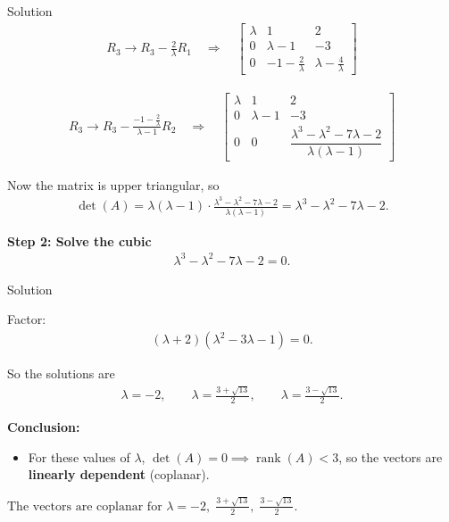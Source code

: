 \documentclass{beamer}
\numberwithin{equation}{section}
\theoremstyle{remark}
\begin{document}
\begin{frame}{Solution}
\begin{align}
R_3 \to R_3 - \tfrac{2}{\lambda}R_1 \quad \Rightarrow \quad
\begin{bmatrix}
\lambda & 1 & 2 \\
0 & \lambda-1 & -3 \\
0 & -1-\tfrac{2}{\lambda} & \lambda - \tfrac{4}{\lambda}
\end{bmatrix}
\end{align}

\begin{align}
R_3 \to R_3 - \frac{-1-\tfrac{2}{\lambda}}{\lambda-1}R_2
\quad \Rightarrow \quad
\begin{bmatrix}
\lambda & 1 & 2 \\
0 & \lambda-1 & -3 \\
0 & 0 & \dfrac{\lambda^3-\lambda^2-7\lambda-2}{\lambda(\lambda-1)}
\end{bmatrix}
\end{align}

Now the matrix is upper triangular, so
\begin{align}
\det(A) = \lambda(\lambda-1)\cdot \frac{\lambda^3-\lambda^2-7\lambda-2}{\lambda(\lambda-1)} 
= \lambda^3 - \lambda^2 - 7\lambda - 2.
\end{align}

\bigskip

\textbf{Step 2: Solve the cubic}  
\begin{align}
\lambda^3 - \lambda^2 - 7\lambda - 2 = 0.
\end{align}
\end{frame}
\begin{frame}{Solution}

Factor:
\begin{align}
(\lambda+2)(\lambda^2 - 3\lambda - 1) = 0.
\end{align}

So the solutions are
\begin{align}
\lambda = -2, \qquad \lambda = \frac{3+\sqrt{13}}{2}, \qquad \lambda = \frac{3-\sqrt{13}}{2}.
\end{align}

\bigskip
\textbf{Conclusion:}  
\begin{itemize}
\item For these values of $\lambda$, $\det(A)=0 \implies \operatorname{rank}(A)<3$, so the vectors are \textbf{linearly dependent} (coplanar).
\end{itemize}

$\boxed{\text{The vectors are coplanar for } \lambda=-2, \; \tfrac{3+\sqrt{13}}{2}, \; \tfrac{3-\sqrt{13}}{2}.}$
\end{frame}
\end{document}
